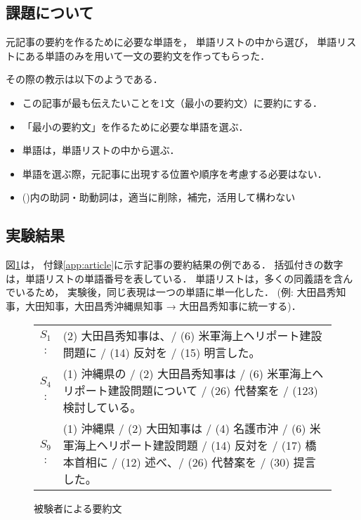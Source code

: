 \subsection{課題について}
\label{sec:task}

元記事の要約を作るために必要な単語を，
単語リストの中から選び，
単語リストにある単語のみを用いて一文の要約文を作ってもらった．

その際の教示は以下のようである．

\begin{itemize}
 \item この記事が最も伝えたいことを1文（最小の要約文）に要約にする．
 \item 「最小の要約文」を作るために必要な単語を選ぶ．
 \item 単語は，単語リストの中から選ぶ．
 \item 単語を選ぶ際，元記事に出現する位置や順序を考慮する必要はない．
 \item ()内の助詞・助動詞は，適当に削除，補完，活用して構わない
\end{itemize}



\subsection{実験結果}
\label{sec:Experimental results}

図\ref{figure:Human-written summary}は，
付録\ref{app:article}に示す記事の要約結果の例である．
括弧付きの数字は，単語リストの単語番号を表している．
単語リストは，多くの同義語を含んでいるため，
実験後，同じ表現は一つの単語に単一化した．
(例: 大田昌秀知事，大田知事，大田昌秀沖縄県知事 → 
大田昌秀知事に統一する)．

\begin{figure}[!htbp]
\begin{center}
\begin{tabular}{c p{90mm}}
\hline
$S_{1}$: & 
\tiny{(2)} \normalsize{大田昌秀知事は、/}
\tiny{(6)} \normalsize{米軍海上ヘリポート建設問題に /}
\tiny{(14)} \normalsize{反対を / }
\tiny{(15)} \normalsize{明言した。} \\
$S_{4}$: &
\tiny{(1)} \normalsize{沖縄県の /}
\tiny{(2)} \normalsize{大田昌秀知事は /}
\tiny{(6)} \normalsize{米軍海上ヘリポート建設問題について /}
\tiny{(26)} \normalsize{代替案を /}
\tiny{(123)} \normalsize{検討している。} \\
$S_{9}$: &
\tiny{(1)} \normalsize{沖縄県 /}
\tiny{(2)} \normalsize{大田知事は /}
\tiny{(4)} \normalsize{名護市沖 /}
\tiny{(6)} \normalsize{米軍海上ヘリポート建設問題 /}
\tiny{(14)} \normalsize{反対を /}
\tiny{(17)} \normalsize{橋本首相に /}
\tiny{(12)} \normalsize{述べ、/}
\tiny{(26)} \normalsize{代替案を /}
\tiny{(30)} \normalsize{提言した。}\\
\hline
\end{tabular}
\caption{被験者による要約文}
\label{figure:Human-written summary}
\end{center}
\end{figure}

